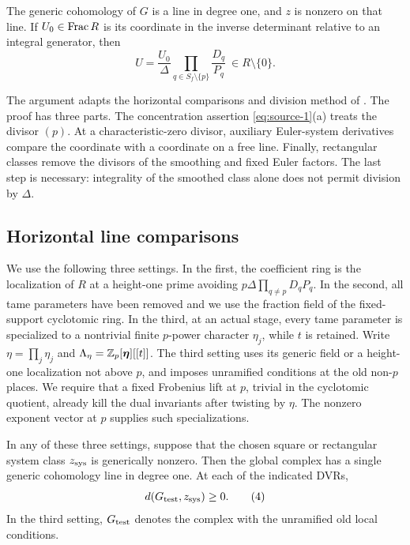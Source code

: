 \begin{proposition}\label{single:integral}
The generic cohomology of \(G\) is a line in degree one, and \(z\)
is nonzero on that line.  If \(U_0\in\operatorname{Frac} R\) is its coordinate in
the inverse determinant relative to an integral generator, then
\begin{equation}
 U=\frac{U_0}{\Delta}
       \prod_{q\in S_f\setminus\{p\}}\frac{D_q}{P_q}
       \ \in R\setminus\{0\}.
 \tag{3}\label{eq:source-3}
\end{equation}
\end{proposition}

The argument adapts the horizontal comparisons and division method
of \cite[Section~5, ``Horizontal line switches'' and
``Removal of the fixed divisors'']{B}.  The proof has three parts.
The concentration assertion
\eqref{eq:source-1}(a) treats the divisor \((p)\).  At a
characteristic-zero divisor, auxiliary Euler-system derivatives
compare the coordinate with a coordinate on a free line.  Finally,
rectangular classes remove the divisors of the smoothing and fixed
Euler factors.  The last step is necessary: integrality of the
smoothed class alone does not permit division by \(\Delta\).

\subsection{Horizontal line comparisons}

We use the following three settings.  In the first, the coefficient
ring is the localization of \(R\) at a height-one prime avoiding
\(p\Delta\prod_{q\ne p}D_qP_q\).  In the second, all tame
parameters have been removed and we use the fraction field of the
fixed-support cyclotomic ring.  In the third, at an actual stage,
every tame parameter is specialized to a nontrivial finite
\(p\)-power character \(\eta_j\), while \(t\) is retained.  Write
\(\eta=\prod_j\eta_j\) and
\(\Lambda_\eta=\mathbb Z_p[\boldsymbol\eta][[t]]\).  The third setting
uses its generic field or a height-one localization not above \(p\),
and imposes unramified conditions at the old non-\(p\) places.
We require that a fixed Frobenius lift at \(p\), trivial in the
cyclotomic quotient, already kill the dual invariants after twisting
by \(\eta\).  The nonzero exponent vector at \(p\) supplies such
specializations.

\begin{lemma}\label{single:line}
In any of these three settings, suppose that the chosen square or
rectangular system class \(z_{\rm sys}\) is generically nonzero.
Then the global complex has a single generic cohomology line in
degree one.  At each of the indicated DVRs,
\begin{equation}
                  d(G_{\rm test},z_{\rm sys})\geq0.
                  \tag{4}\label{eq:source-4}
\end{equation}
In the third setting, \(G_{\rm test}\) denotes the complex with the
unramified old local conditions.
\end{lemma}

